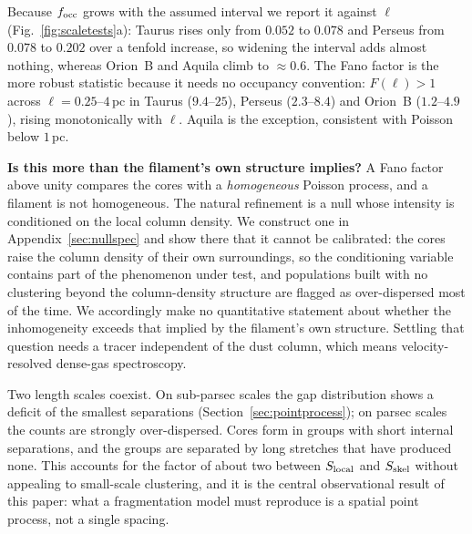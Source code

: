 \documentclass[usenatbib,twoside,twocolumn]{mnras}
\begin{document}
Because $f_{\rm occ}$ grows with the assumed interval we report it against $\ell$ (Fig.~\ref{fig:scaletests}a): Taurus rises only from $0.052$ to $0.078$ and Perseus from $0.078$ to $0.202$ over a tenfold increase, so widening the interval adds almost nothing, whereas Orion~B and Aquila climb to $\approx0.6$. The Fano factor is the more robust statistic because it needs no occupancy convention: $F(\ell)>1$ across $\ell=0.25$--$4$\,pc in Taurus ($9.4$--$25$), Perseus ($2.3$--$8.4$) and Orion~B ($1.2$--$4.9$), rising monotonically with $\ell$. Aquila is the exception, consistent with Poisson below $1$\,pc.

\smallskip\noindent\textbf{Is this more than the filament's own structure implies?} A Fano factor above unity compares the cores with a \emph{homogeneous} Poisson process, and a filament is not homogeneous. The natural refinement is a null whose intensity is conditioned on the local column density. We construct one in Appendix~\ref{sec:nullspec} and show there that it cannot be calibrated: the cores raise the column density of their own surroundings, so the conditioning variable contains part of the phenomenon under test, and populations built with no clustering beyond the column-density structure are flagged as over-dispersed most of the time. We accordingly make no quantitative statement about whether the inhomogeneity exceeds that implied by the filament's own structure. Settling that question needs a tracer independent of the dust column, which means velocity-resolved dense-gas spectroscopy.

Two length scales coexist. On sub-parsec scales the gap distribution shows a deficit of the smallest separations (Section~\ref{sec:pointprocess}); on parsec scales the counts are strongly over-dispersed. Cores form in groups with short internal separations, and the groups are separated by long stretches that have produced none. This accounts for the factor of about two between $S_{\rm local}$ and $S_{\rm skel}$ without appealing to small-scale clustering, and it is the central observational result of this paper: what a fragmentation model must reproduce is a spatial point process, not a single spacing.
\end{document}
